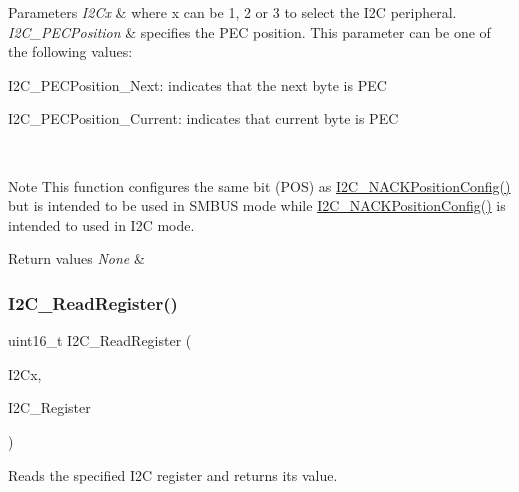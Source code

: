 \begin{DoxyParams}{Parameters}
{\em I2\+Cx} & where x can be 1, 2 or 3 to select the I2C peripheral. \\
\hline
{\em I2\+C\+\_\+\+P\+E\+C\+Position} & specifies the P\+EC position. This parameter can be one of the following values\+: \begin{DoxyItemize}
\item I2\+C\+\_\+\+P\+E\+C\+Position\+\_\+\+Next\+: indicates that the next byte is P\+EC \item I2\+C\+\_\+\+P\+E\+C\+Position\+\_\+\+Current\+: indicates that current byte is P\+EC\end{DoxyItemize}
\\
\hline
\end{DoxyParams}
\begin{DoxyNote}{Note}
This function configures the same bit (P\+OS) as \mbox{\hyperlink{group___i2_c___group1_gad08ebffc3a234d84e6405ec115bd74f1}{I2\+C\+\_\+\+N\+A\+C\+K\+Position\+Config()}} but is intended to be used in S\+M\+B\+US mode while \mbox{\hyperlink{group___i2_c___group1_gad08ebffc3a234d84e6405ec115bd74f1}{I2\+C\+\_\+\+N\+A\+C\+K\+Position\+Config()}} is intended to used in I2C mode.
\end{DoxyNote}

\begin{DoxyRetVals}{Return values}
{\em None} & \\
\hline
\end{DoxyRetVals}
\mbox{\label{group___i2_c_ga8021dc796d15f997356b0583d6346805}} 
\subsubsection{\texorpdfstring{I2\+C\+\_\+\+Read\+Register()}{I2C\_ReadRegister()}}
{\footnotesize\ttfamily uint16\+\_\+t I2\+C\+\_\+\+Read\+Register (\begin{DoxyParamCaption}\item[{I2\+C\+\_\+\+Type\+Def $\ast$}]{I2\+Cx,  }\item[{uint8\+\_\+t}]{I2\+C\+\_\+\+Register }\end{DoxyParamCaption})}



Reads the specified I2C register and returns its value. 


